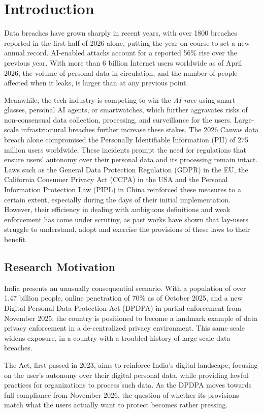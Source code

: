 \chapter{Introduction}

Data breaches have grown sharply in recent years, with over 1800 breaches reported in the first half of 2026 alone, putting the year on course to set a new annual record. AI-enabled attacks account for a reported 56\% rise over the previous year. With more than 6 billion Internet users worldwide as of April 2026, the volume of personal data in circulation, and the number of people affected when it leaks, is larger than at any previous point. 

Meanwhile, the tech industry is competing to win the \textit{AI race} using smart glasses, personal AI agents, or smartwatches, which further aggravates risks of non-consensual data collection, processing, and surveillance for the users. Large-scale infrastructural breaches further increase these stakes. The 2026 Canvas data breach alone compromised the Personally Identifiable Information (PII) of 275 million users worldwide. These incidents prompt the need for regulations that ensure users' autonomy over their personal data and its processing remain intact. Laws such as the General Data Protection Regulation (GDPR) in the EU, the California Consumer Privacy Act (CCPA) in the USA and the Personal Information Protection Law (PIPL) in China reinforced these measures to a certain extent, especially during the days of their initial implementation. However, their efficiency in dealing with ambiguous definitions and weak enforcement has come under scrutiny, as past works have shown that lay-users struggle to understand, adopt and exercise the provisions of these laws to their benefit.

\section{Research Motivation}

India presents an unusually consequential scenario. With a population of over 1.47 billion people, online penetration of 70\% as of October 2025, and a new Digital Personal Data Protection Act (DPDPA) in partial enforcement from November 2025, the country is positioned to become a landmark example of data privacy enforcement in a de-centralized privacy environment. This same scale widens exposure, in a country with a troubled history of large-scale data breaches.

The Act, first passed in 2023, aims to reinforce India's digital landscape, focusing on the user's autonomy over their digital personal data, while providing lawful practices for organizations to process such data. As the DPDPA moves towards full compliance from November 2026, the question of whether its provisions match what the users actually want to protect becomes rather pressing. 

